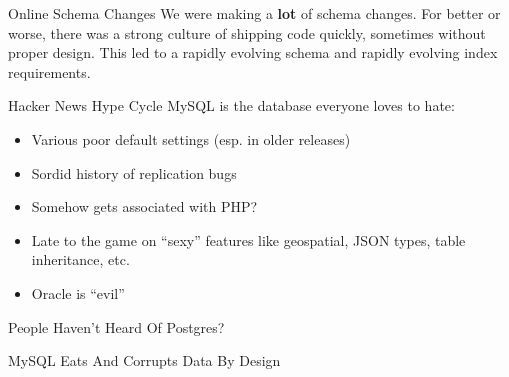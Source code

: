 \documentclass[14pt]{beamer}
\begin{document}
\begin{frame}{Online Schema Changes}
  We were making a \textbf{lot} of schema changes.
  \newline
  \newline
  For better or worse, there was a strong culture of shipping code quickly,
  sometimes without proper design. This led to a rapidly evolving schema and
  rapidly evolving index requirements.
\end{frame}

\begin{frame}{Hacker News Hype Cycle}
  MySQL is the database everyone loves to hate:
  \begin{itemize}
    \item Various poor default settings (esp. in older releases)
    \item Sordid history of replication bugs
    \item Somehow gets associated with PHP?
    \item Late to the game on ``sexy'' features like geospatial, JSON
      types, table inheritance, etc.
    \item Oracle is ``evil''
  \end{itemize}
\end{frame}

\begin{frame}{People Haven't Heard Of Postgres?}
\end{frame}

\begin{frame}{MySQL Eats And Corrupts Data By Design}
\end{frame}
\end{document}
